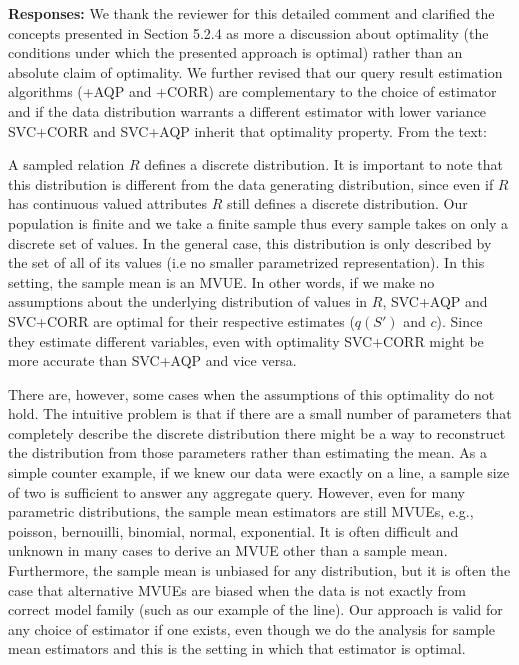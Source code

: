 \vspace{.25em}

{\bf Responses:} We thank the reviewer for this detailed comment and clarified the concepts presented in Section 5.2.4 as more a discussion about optimality (the conditions under which the presented approach is optimal) rather than an absolute claim of optimality. We further revised that our query result estimation algorithms (\svcnospace+AQP and \svcnospace+CORR) are complementary to the choice of estimator and if the data distribution warrants a different estimator with lower variance SVC+CORR and SVC+AQP inherit that optimality property. From the text:  
\begin{displayquote}A sampled relation $R$ defines a discrete distribution. It is important to note that this distribution is different from the data generating distribution, since even if $R$ has continuous valued attributes $R$ still defines a discrete distribution. Our population is finite and we take a finite sample thus every sample takes on only a discrete set of values. In the general case, this distribution is only described by the set of all of its values (i.e no smaller parametrized representation). In this setting, the sample mean is an MVUE. In other words, if we make no assumptions about the underlying distribution of values in $R$, SVC+AQP and SVC+CORR are optimal for their respective estimates ($q(S')$ and $c$). Since they estimate different variables, even with optimality SVC+CORR might be more accurate than SVC+AQP and vice versa. 

There are, however, some cases when the assumptions of this optimality do not hold.
 The intuitive problem is that if there are a small number of parameters that completely describe the discrete distribution there might be a way to reconstruct the distribution from those parameters rather than estimating the mean. As a simple counter example, if we knew our data were exactly on a line, a sample size of two is sufficient to answer any aggregate query. However, even for many parametric distributions, the sample mean estimators are still MVUEs, e.g., poisson, bernouilli, binomial, normal, exponential. It is often difficult and unknown in many cases to derive an MVUE other than a sample mean. Furthermore, the sample mean is unbiased for any distribution, but it is often the case that alternative MVUEs are biased when the data is not exactly from correct model family (such as our example of the line). Our approach is valid for any choice of estimator if one exists, even though we do the analysis for sample mean estimators and this is the setting in which that estimator is optimal.\end{displayquote}



